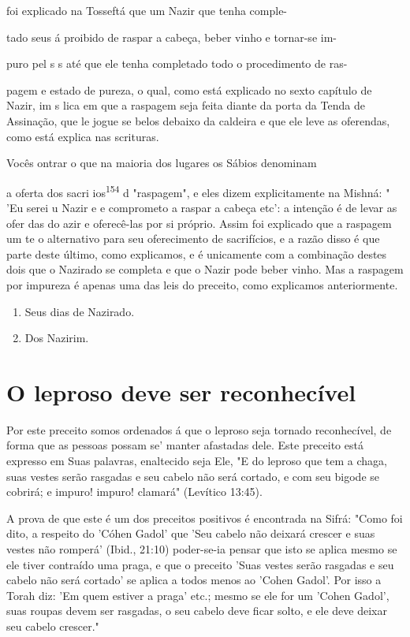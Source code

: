 \begin{itemize}
\begin{enumrate}
\begin{itemize}
\begin{itemize}
foi explicado na Tosseftá que um Nazir que tenha comple-


tado seus á proibido de raspar a cabeça, beber vinho e tornar-se im-

puro pel s s até que ele tenha completado todo o procedimento de ras-

pagem e estado de pureza, o qual, como está explicado no sexto capítulo
de Nazir, im s lica em que a raspagem seja feita diante da porta da
Tenda de Assina­ção, que le jogue se belos debaixo da caldeira e que ele
leve as oferendas, como está explica nas scrituras.

Vocês ontrar o que na maioria dos lugares os Sábios denominam

a oferta dos sacri ios\textsuperscript{154} d "raspagem", e eles dizem
explicitamente na Mish­ná: " 'Eu serei u Nazir e e comprometo a raspar a
cabeça etc': a intenção é de levar as ofer das do azir e oferecê-las por
si próprio. Assim foi explica­do que a raspagem um te o alternativo para
seu oferecimento de sacrifícios, e a razão disso é que parte deste
último, como explicamos, e é unicamente com a combinação destes dois que
o Nazirado se completa e que o Nazir pode beber vinho. Mas a raspagem
por impureza é apenas uma das leis do preceito, como explicamos
anteriormente.


\begin{enumerate}
\def\labelenumi{\arabic{enumi}.}
\setcounter{enumi}{152}
\item
 
 Seus dias de Nazirado.
 
\item
 
 Dos Nazirim.
 
\end{enumerate}




\section{O leproso deve ser reconhecível}

Por este preceito somos ordenados á que o leproso seja tornado
re­conhecível, de forma que as pessoas possam se' manter afastadas dele.
Este pre­ceito está expresso em Suas palavras, enaltecido seja Ele, "E
do leproso que tem a chaga, suas vestes serão rasgadas e seu cabelo não
será cortado, e com seu bigode se cobrirá; e impuro! impuro! clamará"
(Levítico 13:45).

A prova de que este é um dos preceitos positivos é encontrada na Sifrá:
"Como foi dito, a respeito do 'Cóhen Gadol' que 'Seu cabelo não deixará
crescer e suas vestes não romperá' (Ibid., 21:10) poder-se-ia pensar que
isto se aplica mesmo se ele tiver contraído uma praga, e que o preceito
'Suas vestes serão rasgadas e seu cabelo não será cortado' se aplica a
todos menos ao 'Co­hen Gadol'. Por isso a Torah diz: 'Em quem estiver a
praga' etc.; mesmo se ele for um 'Cohen Gadol', suas roupas devem ser
rasgadas, o seu cabelo deve ficar solto, e ele deve deixar seu cabelo
crescer."


\end{itemize}
\end{itemize}
\end{enumrate}
\end{itemize}
